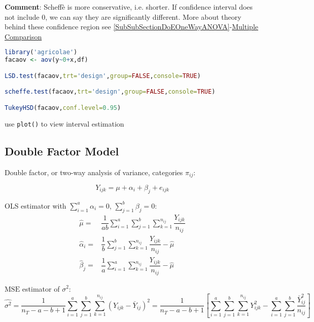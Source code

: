     \textbf{Comment}: Scheff\`{e} is more conservative, i.e. shorter. If confidence interval does not include $ 0 $, we can say they are significantly different. More about theory behind these confidence region see \autoref{SubSubSectionDoEOneWayANOVA}-\hyperlink{DoEMultipleComparison}{Multiple Comparison}

\begin{rcode}
\begin{lstlisting}[language=R]
library('agricolae')
facaov <- aov(y~0+x,df)

LSD.test(facaov,trt='design',group=FALSE,console=TRUE)

scheffe.test(facaov,trt='design',group=FALSE,console=TRUE)

TukeyHSD(facaov,conf.level=0.95)
\end{lstlisting}
use \lstinline|plot()| to view interval estimation
\end{rcode}    
    
    


\subsection{Double Factor Model}
    Double factor, or two-way analysis of variance, categories $ \pi_{ij} $:
    
    \begin{equation}
        Y_{ijk}= \mu +\alpha _i+\beta _j+e_{ijk}
    \end{equation}
    
    OLS estimator with $ \sum_{i=1}^a \alpha _i=0 $, $ \sum_{j=1}^b\beta _j=0 $:
    \begin{align}
        \hat{\mu }=&\dfrac{1}{ab}\sum_{i=1}^a\sum_{j=1}^b\sum_{k=1}^{n_{ij}}\dfrac{Y_{ijk}}{n_{ij}}\\
        \hat{\alpha }_i=&\dfrac{1}{b}\sum_{j=1}^b\sum_{k=1}^{n_{ij}}\dfrac{Y_{ijk}}{n_{ij}}-\hat{\mu }\\
        \hat{\beta }_j =&\dfrac{1}{a}\sum_{i=1}^a\sum_{k=1}^{n_{ij}}\dfrac{Y_{ijk}}{n_{ij}}-\hat{\mu }
    \end{align}
    
    $ \mathrm{MSE}  $ estimator of $ \sigma ^2 $:
    \begin{equation}
        \hat{\sigma ^2}= \dfrac{1}{n_T-a-b+1}\sum_{i=1}^a\sum_{j=1}^b\sum_{k=1}^{n_{ij}}(Y_{ijk}-\bar{Y}_{ij})^2=\dfrac{1}{n_T-a-b+1}\left[ \sum_{i=1}^a\sum_{j=1}^b\sum_{k=1}^{n_{ij}}Y_{ijk}^2-\sum_{i=1}^a\sum_{j=1}^b\dfrac{\bar{Y}_{ij}^2}{n_{ij}} \right]
    \end{equation}


